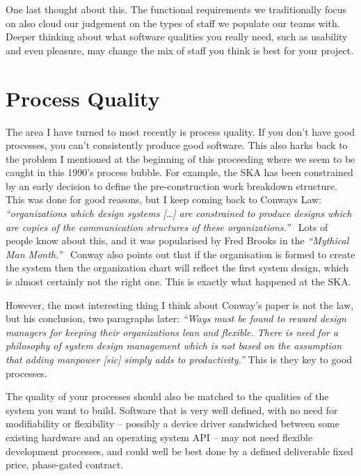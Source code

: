 \documentclass[11pt,twoside]{article}
\begin{document}
One last thought about this. The functional requirements we traditionally focus on 
also cloud our judgement on the types of staff 
we populate our teams with. Deeper 
thinking about what software qualities you really need, such as usability and even pleasure, 
may change the mix of staff you think is best for your project. 

\section{Process Quality} %
\label{sec:process_quality}
The area I have turned to most recently is process quality. If you don't have good 
processes, you can't consistently produce good software. This also harks back to the 
problem I mentioned at the beginning of this proceeding where we seem to be caught in this 
1990's process bubble. For example, the SKA has been constrained by an early decision 
to define the pre-construction work breakdown structure. This was done for good reasons,
but I keep coming back to Conways Law: \emph{``organizations which design systems [\ldots] 
are constrained to produce designs which are copies of the communication structures 
of these organizations.''}~\citep{conway1968} Lots of people know about this, and it was 
popularised by Fred Brooks in the \emph{``Mythical Man Month.''}~\citep{brooks1995} Conway also 
points out that if the organisation is formed to create the system then the organization 
chart will reflect the first system design, which is almost certainly not the right one. 
This is exactly what happened at the SKA.

However, the most interesting thing I think about Conway's paper is not the law, 
but his conclusion, two paragraphs later: \emph{``Ways must be found to reward design managers for keeping 
their organizations lean and flexible. There is need for a philosophy 
of system design management which is not based on the assumption that adding manpower [sic] simply adds to productivity.''}
This is they key to good processes. 

The quality of your processes should also be matched to the qualities of the system 
you want to build. Software that is very well defined, with no need for modifiability or 
flexibility -- possibly a device driver sandwiched between some existing hardware and 
an operating system API -- may not need flexible development processes, and could 
well be best done by a defined deliverable fixed price, phase-gated contract. 
\end{document}
